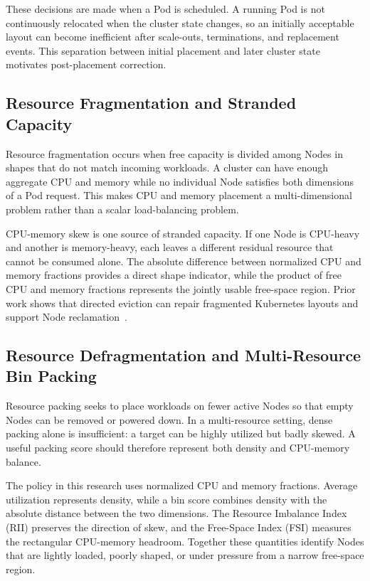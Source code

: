 These decisions are made when a Pod is scheduled. A running Pod is not continuously relocated when the cluster state changes, so an initially acceptable layout can become inefficient after scale-outs, terminations, and replacement events. This separation between initial placement and later cluster state motivates post-placement correction.

\subsection{Resource Fragmentation and Stranded Capacity}
\label{sec:resourceFragmentation}

Resource fragmentation occurs when free capacity is divided among Nodes in shapes that do not match incoming workloads. A cluster can have enough aggregate CPU and memory while no individual Node satisfies both dimensions of a Pod request. This makes CPU and memory placement a multi-dimensional problem rather than a scalar load-balancing problem.

CPU-memory skew is one source of stranded capacity. If one Node is CPU-heavy and another is memory-heavy, each leaves a different residual resource that cannot be consumed alone. The absolute difference between normalized CPU and memory fractions provides a direct shape indicator, while the product of free CPU and memory fractions represents the jointly usable free-space region. Prior work shows that directed eviction can repair fragmented Kubernetes layouts and support Node reclamation~\cite{larsson_klein_elmroth_2023}.

\subsection{Resource Defragmentation and Multi-Resource Bin Packing}
\label{sec:binPacking}

Resource packing seeks to place workloads on fewer active Nodes so that empty Nodes can be removed or powered down. In a multi-resource setting, dense packing alone is insufficient: a target can be highly utilized but badly skewed. A useful packing score should therefore represent both density and CPU-memory balance.

The policy in this research uses normalized CPU and memory fractions. Average utilization represents density, while a bin score combines density with the absolute distance between the two dimensions. The Resource Imbalance Index (RII) preserves the direction of skew, and the Free-Space Index (FSI) measures the rectangular CPU-memory headroom. Together these quantities identify Nodes that are lightly loaded, poorly shaped, or under pressure from a narrow free-space region.

